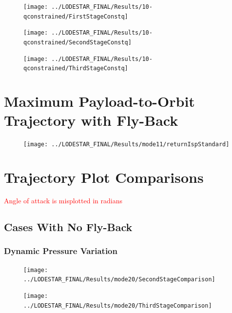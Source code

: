 \begin{figure}[th]
\centering
\texttt{[image: ../LODESTAR\_FINAL/Results/10-qconstrained/FirstStageConstq]}
\caption{}
\label{fig:FirstStageqConstrained68}
\end{figure}
		
\begin{figure}[th]
\centering
\texttt{[image: ../LODESTAR\_FINAL/Results/10-qconstrained/SecondStageConstq]}
\caption{}
\label{fig:SecondStageqConstrained68}
\end{figure}

\begin{figure}[th]
\centering
\texttt{[image: ../LODESTAR\_FINAL/Results/10-qconstrained/ThirdStageConstq]}
\caption{}
\label{fig:ThirdStageqConstrained68}
\end{figure}

\chapter{Maximum Payload-to-Orbit Trajectory with Fly-Back}\label{appendix:flyback}

\begin{figure}
\centering
\texttt{[image: ../LODESTAR\_FINAL/Results/mode11/returnIspStandard]}
\caption{}
\label{fig:returnIspStandard}
\end{figure}

		
		\chapter{Trajectory Plot Comparisons}\label{sec:Appendix_trajectorycomparisons}
		
		\textcolor{red}{Angle of attack is misplotted in radians}
		
		\section{Cases With No Fly-Back}
		
		\subsection{Dynamic Pressure Variation}
		
		
\begin{figure}[!ht]
\centering
\texttt{[image: ../LODESTAR\_FINAL/Results/mode20/SecondStageComparison]}
\caption{}
\label{fig:SecondStageComparison1}
\end{figure}

\begin{figure}[!th]
\centering
\texttt{[image: ../LODESTAR\_FINAL/Results/mode20/ThirdStageComparison]}
\caption{}
\label{fig:ThirdStageComparison1}
\end{figure}
\FloatBarrier
